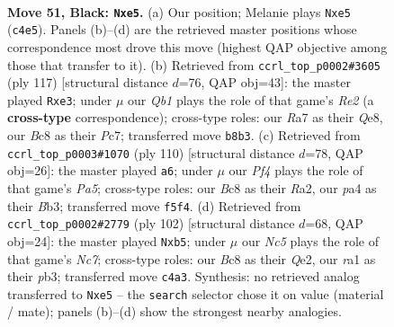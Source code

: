 \documentclass[11pt]{article}
\begin{document}
\clearpage

\begin{figure}[p]\centering
\begin{subfigure}{0.46\textwidth}\centering
\resizebox{\linewidth}{!}{%
\newchessgame
\chessboard[
  setfen={1qb5/r2k4/4p3/p2pPpBQ/P1n4P/3N4/2R5/RN4K1 b - - 0 51},
  showmover=false,
  pgfstyle=straightmove, color=movearrow, markmove={c4-e5}
]}
\caption{}
\end{subfigure}\hfill
\begin{subfigure}{0.46\textwidth}\centering
\resizebox{\linewidth}{!}{%
\newchessgame
\chessboard[
  setfen={1k2q3/2p1r3/1p4p1/p5N1/3n1R1P/P2pN3/1PP3Q1/1K6 b - - 1 59},
  showmover=false,
  pgfstyle=straightmove, color=movearrow, markmove={e7-e3}
]}
\caption{}
\end{subfigure}
\\[4pt]
\begin{subfigure}{0.46\textwidth}\centering
\resizebox{\linewidth}{!}{%
\newchessgame
\chessboard[
  setfen={4r3/8/3p2pk/P2P1p2/1PQNpn2/KB3Pb1/R7/4q3 w - - 6 56},
  showmover=false,
  pgfstyle=straightmove, color=movearrow, markmove={a5-a6}
]}
\caption{}
\end{subfigure}\hfill
\begin{subfigure}{0.46\textwidth}\centering
\resizebox{\linewidth}{!}{%
\newchessgame
\chessboard[
  setfen={R1R5/1rN1bk2/3p4/1p1P1P2/2n1P1p1/1pq3P1/4QK2/8 w - - 2 52},
  showmover=false,
  pgfstyle=straightmove, color=movearrow, markmove={c7-b5}
]}
\caption{}
\end{subfigure}
\caption{\textbf{Move 51, Black: \texttt{Nxe5}.} (a) Our position; Melanie plays \texttt{Nxe5} (\texttt{c4e5}). Panels (b)--(d) are the retrieved master positions whose correspondence most drove this move (highest QAP objective among those that transfer to it). (b) Retrieved from \texttt{ccrl\_top\_p0002\#3605} (ply 117) [structural distance $d$=76, QAP obj=43]: the master played \texttt{Rxe3}; under $\mu$ our \emph{Qb1} plays the role of that game's \emph{Re2} (a \textbf{cross-type} correspondence); cross-type roles: our \emph{R}a7 as their \emph{Q}e8, our \emph{B}c8 as their \emph{P}c7; transferred move \texttt{b8b3}. (c) Retrieved from \texttt{ccrl\_top\_p0003\#1070} (ply 110) [structural distance $d$=78, QAP obj=26]: the master played \texttt{a6}; under $\mu$ our \emph{Pf4} plays the role of that game's \emph{Pa5}; cross-type roles: our \emph{B}c8 as their \emph{R}a2, our \emph{p}a4 as their \emph{B}b3; transferred move \texttt{f5f4}. (d) Retrieved from \texttt{ccrl\_top\_p0002\#2779} (ply 102) [structural distance $d$=68, QAP obj=24]: the master played \texttt{Nxb5}; under $\mu$ our \emph{Nc5} plays the role of that game's \emph{Nc7}; cross-type roles: our \emph{B}c8 as their \emph{Q}e2, our \emph{r}a1 as their \emph{p}b3; transferred move \texttt{c4a3}. Synthesis: no retrieved analog transferred to \texttt{Nxe5} -- the \texttt{search} selector chose it on value (material / mate); panels (b)--(d) show the strongest nearby analogies.}
\label{fig:thought-m101}
\end{figure}
\end{document}
